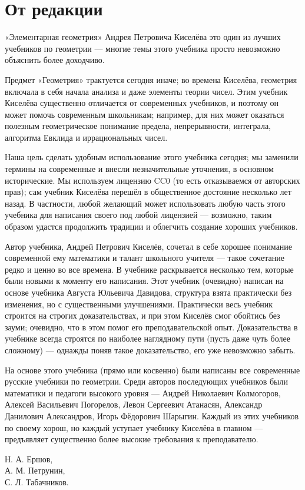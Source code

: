 \section*{От редакции}


«Элементарная геометрия» Андрея Петровича Киселёва это один из лучших учебников по геометрии —
многие темы этого учебника просто невозможно объяснить более доходчиво.

Предмет «Геометрия» трактуется сегодня иначе;
во времена Киселёва, геометрия включала в себя начала анализа и даже элементы теории чисел.
Этим учебник Киселёва существенно отличается от современных учебников, и поэтому он может помочь современным школьникам;
например, для них может оказаться полезным геометрическое понимание предела, непрерывности, интеграла, алгоритма Евклида и иррациональных чисел.

Наша цель сделать удобным использование этого учебника сегодня;
мы заменили термины на современные и внесли незначительные уточнения, в основном исторические. 
Мы используем лицензию CC0 (то есть отказываемся от авторских прав); сам учебник Киселёва перешёл в общественное достояние несколько лет назад.
В частности, любой желающий может использовать любую часть этого учебника для написания своего под любой лицензией —
возможно, таким образом удастся продолжить традиции и облегчить создание хороших учебников. 

Автор учебника, Андрей Петрович Киселёв, сочетал в себе хорошее понимание современной ему математики и талант школьного учителя — такое сочетание редко и ценно во все времена.
В учебнике раскрывается несколько тем, которые были новыми к моменту его написания. 
Этот учебник (очевидно) написан на основе учебника Августа Юльевича Давидова, структура взята практически без изменения, но с существенными улучшениями.
Практически весь учебник строится на строгих доказательствах, и при этом Киселёв смог обойтись без зауми;
очевидно, что в этом помог его преподавательской опыт.
Доказательства в учебнике всегда строятся по наиболее наглядному пути (пусть даже чуть более сложному) — однажды поняв такое доказательство, его уже невозможно забыть. 

На основе этого учебника (прямо или косвенно) были написаны все современные русские учебники по геометрии.
Среди авторов последующих учебников были математики и педагоги высокого уровня — 
Андрей Николаевич Колмогоров, 
Алексей Васильевич Погорелов, 
Левон Сергеевич Атанасян, 
Александр Данилович Александров, 
Игорь Фёдорович Шарыгин.
Каждый из этих учебников по своему хорош, но каждый уступает учебнику Киселёва в главном —
предъявляет существенно более высокие требования к преподавателю.

\begin{flushright}
Н. А. Ершов,\\ 
А. М. Петрунин,\\ 
С. Л. Табачников.        
\end{flushright}
\clearpage
